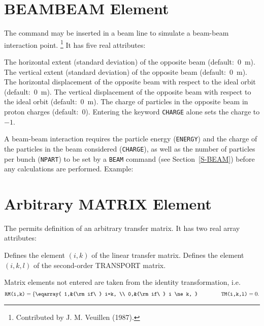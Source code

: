\section{BEAMBEAM Element}
\label{S-BB}
The command  may be inserted in a beam line
to simulate a beam-beam interaction point.%
\footnote{Contributed by J. M. Veuillen (1987).}
It has five real attributes:
\begin{mylist}
The horizontal extent (standard deviation) of the opposite beam
(default:~0~m).
The vertical extent (standard deviation) of the opposite beam
(default:~0~m).
The horizontal displacement of the opposite beam with respect to
the ideal orbit (default:~0~m).
The vertical displacement of the opposite beam with respect to
the ideal orbit (default:~0~m).
The charge of particles in the opposite beam in proton charges
(default:~0).
Entering the keyword {\tt CHARGE} alone sets the charge to \(-1\).
\end{mylist}
A beam-beam interaction requires the particle energy ({\tt ENERGY})
and the charge of the particles in the beam considered ({\tt CHARGE}),
as well as the number of particles per bunch ({\tt NPART})
to be set by a {\tt BEAM} command (see Section~\ref{S-BEAM})
before any calculations are performed.
Example:
 
\section{Arbitrary MATRIX Element}
\label{S-MATRIX}
The  permits definition of an arbitrary transfer matrix.
It has two real array attributes:
\begin{mylist}
Defines the element \((i,k)\) of the linear transfer matrix.
Defines the element \((i,k,l)\) of the second-order TRANSPORT matrix.
\end{mylist}
Matrix elements not entered are taken from the identity transformation,
i.e.
\[
\hbox{\tt RM(i,k)} = \left\{ \eqarray{
1,&{\rm if\ } i=k, \\ 0,&{\rm if\ } i \ne k,
} \right.
\qquad \qquad \hbox{\tt TM(i,k,l)} = 0.
\]
 
